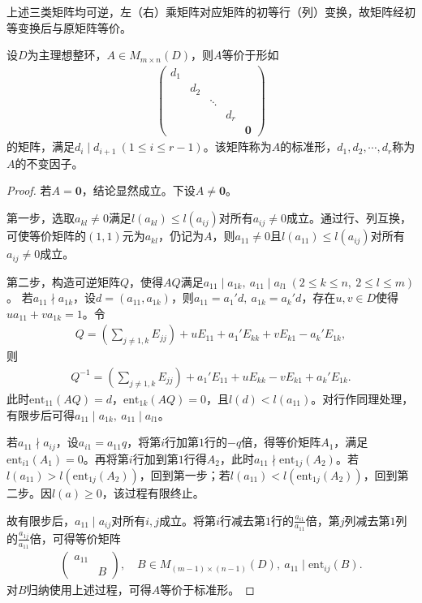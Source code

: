 \documentclass[../../main.tex]{subfiles}%
\begin{document}
\begin{remark}
上述三类矩阵均可逆，左（右）乘矩阵对应矩阵的初等行（列）变换，故矩阵经初等变换后与原矩阵等价。
\end{remark}

\begin{theorem}
设$D$为主理想整环，$A\in M_{m\times n}(D)$，则$A$等价于形如
\begin{align*}
\begin{pmatrix}
d_1&&&\\
&d_2&&\\
&&\ddots&\\
&&&d_r\\
&&&&\boldsymbol{0}
\end{pmatrix}
\end{align*}
的矩阵，满足$d_i\mid d_{i+1}\ (1\leqslant i\leqslant r-1)$。该矩阵称为$A$的标准形，$d_1,d_2,\cdots,d_r$称为$A$的不变因子。
\end{theorem}

\begin{proof}

若$A=\boldsymbol{0}$，结论显然成立。下设$A\neq\boldsymbol{0}$。

第一步，选取$a_{kl}\neq0$满足$l(a_{kl})\leqslant l(a_{ij})$对所有$a_{ij}\neq0$成立。通过行、列互换，可使等价矩阵的$(1,1)$元为$a_{kl}$，仍记为$A$，则$a_{11}\neq0$且$l(a_{11})\leqslant l(a_{ij})$对所有$a_{ij}\neq0$成立。

第二步，构造可逆矩阵$Q$，使得$AQ$满足$a_{11}\mid a_{1k},\ a_{11}\mid a_{l1}\ (2\leqslant k\leqslant n,\ 2\leqslant l\leqslant m)$。
若$a_{11}\nmid a_{1k}$，设$d=(a_{11},a_{1k})$，则$a_{11}=a_1'd,\ a_{1k}=a_k'd$，存在$u,v\in D$使得$ua_{11}+va_{1k}=1$。令
\begin{align*}
Q=\left(\sum_{j\neq1,k}E_{jj}\right)+uE_{11}+a_1'E_{kk}+vE_{k1}-a_k'E_{1k},
\end{align*}
则
\begin{align*}
Q^{-1}=\left(\sum_{j\neq1,k}E_{jj}\right)+a_1'E_{11}+uE_{kk}-vE_{k1}+a_k'E_{1k}.
\end{align*}
此时$\mathrm{ent}_{11}(AQ)=d$，$\mathrm{ent}_{1k}(AQ)=0$，且$l(d)<l(a_{11})$。对行作同理处理，有限步后可得$a_{11}\mid a_{1k},\ a_{11}\mid a_{l1}$。

若$a_{11}\nmid a_{ij}$，设$a_{i1}=a_{11}q$，将第$i$行加第$1$行的$-q$倍，得等价矩阵$A_1$，满足$\mathrm{ent}_{i1}(A_1)=0$。再将第$i$行加到第$1$行得$A_2$，此时$a_{11}\nmid\mathrm{ent}_{1j}(A_2)$。若$l(a_{11})>l(\mathrm{ent}_{1j}(A_2))$，回到第一步；若$l(a_{11})<l(\mathrm{ent}_{1j}(A_2))$，回到第二步。因$l(a)\geqslant0$，该过程有限终止。

故有限步后，$a_{11}\mid a_{ij}$对所有$i,j$成立。将第$i$行减去第$1$行的$\frac{a_{i1}}{a_{11}}$倍，第$j$列减去第$1$列的$\frac{a_{1j}}{a_{11}}$倍，可得等价矩阵
\begin{align*}
\begin{pmatrix}
a_{11}&\\
&B
\end{pmatrix},\quad B\in M_{(m-1)\times(n-1)}(D),\ a_{11}\mid\mathrm{ent}_{ij}(B).
\end{align*}
对$B$归纳使用上述过程，可得$A$等价于标准形。

\end{proof}
\end{document}
